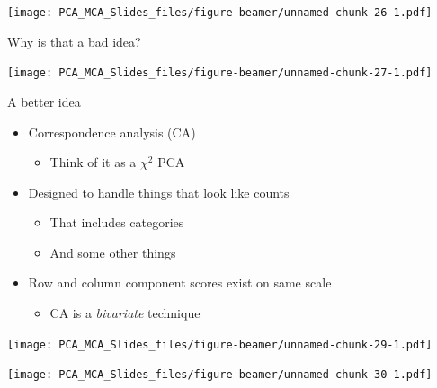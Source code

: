 \documentclass[
  ignorenonframetext,
]{beamer}
\providecommand{\tightlist}{%
  \setlength{\itemsep}{0pt}\setlength{\parskip}{0pt}}
\begin{document}
\begin{frame}

\texttt{[image: PCA\_MCA\_Slides\_files/figure-beamer/unnamed-chunk-26-1.pdf]}

\end{frame}

\begin{frame}{Why is that a bad idea?}
\protect\hypertarget{why-is-that-a-bad-idea}{}

\texttt{[image: PCA\_MCA\_Slides\_files/figure-beamer/unnamed-chunk-27-1.pdf]}

\end{frame}

\begin{frame}{A better idea}
\protect\hypertarget{a-better-idea}{}

\begin{itemize}[<+->]
\tightlist
\item
  Correspondence analysis (CA)

  \begin{itemize}[<+->]
  \tightlist
  \item
    Think of it as a \(\chi^2\) PCA
  \end{itemize}
\item
  Designed to handle things that look like counts

  \begin{itemize}[<+->]
  \tightlist
  \item
    That includes categories
  \item
    And some other things
  \end{itemize}
\item
  Row and column component scores exist on same scale

  \begin{itemize}[<+->]
  \tightlist
  \item
    CA is a \emph{bivariate} technique
  \end{itemize}
\end{itemize}

\end{frame}

\begin{frame}

\texttt{[image: PCA\_MCA\_Slides\_files/figure-beamer/unnamed-chunk-29-1.pdf]}

\end{frame}

\begin{frame}

\texttt{[image: PCA\_MCA\_Slides\_files/figure-beamer/unnamed-chunk-30-1.pdf]}

\end{frame}
\end{document}
